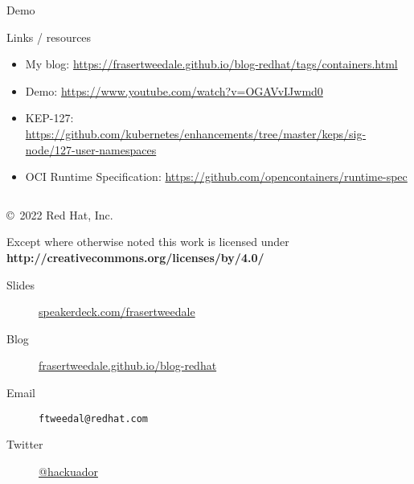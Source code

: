 \documentclass[ignorenonframetext,aspectratio=169,12pt]{beamer}
\begin{document}
\begin{frame}[plain]
\centering
\huge Demo
\end{frame}


\begin{frame}{Links / resources}
\protect\hypertarget{links}{}

\begin{itemize}
\item My blog: \url{https://frasertweedale.github.io/blog-redhat/tags/containers.html}
\item Demo: \url{https://www.youtube.com/watch?v=OGAVvIJwmd0}
\item KEP-127: \url{https://github.com/kubernetes/enhancements/tree/master/keps/sig-node/127-user-namespaces}
\item OCI Runtime Specification: \url{https://github.com/opencontainers/runtime-spec}
\end{itemize}

\end{frame}


\begin{frame}[plain]
\begin{columns}

  \begin{column}{.6\textwidth}

    \setlength{\parskip}{.5em}

    { \centering

    

    \copyright~2022  Red Hat, Inc.

    { \scriptsize
    Except where otherwise noted this work is licensed under
    }
    { \footnotesize
    \textbf{http://creativecommons.org/licenses/by/4.0/}
    }

    }

    \begin{description}
      \item[Slides] \href{https://speakerdeck.com/frasertweedale}{speakerdeck.com/frasertweedale}
      \item[Blog] \href{https://frasertweedale.github.io/blog-redhat/}{frasertweedale.github.io/blog-redhat}
      \item[Email] \texttt{ftweedal@redhat.com}
      \item[Twitter] \href{https://twitter.com/hackuador}{@hackuador}
    \end{description}
  \end{column}

\end{columns}
\end{frame}
\end{document}

